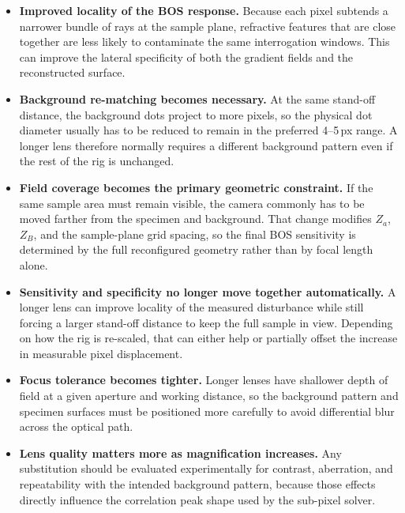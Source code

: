 \documentclass[11pt]{article}
\begin{document}
\begin{itemize}
  \item \textbf{Improved locality of the BOS response.} Because each pixel
        subtends a narrower bundle of rays at the sample plane, refractive
        features that are close together are less likely to contaminate the
        same interrogation windows. This can improve the lateral specificity
        of both the gradient fields and the reconstructed surface.

  \item \textbf{Background re-matching becomes necessary.} At the same
        stand-off distance, the background dots project to more pixels, so
        the physical dot diameter usually has to be reduced to remain in the
        preferred 4--5\,px range. A longer lens therefore normally requires
        a different background pattern even if the rest of the rig is
        unchanged.

  \item \textbf{Field coverage becomes the primary geometric constraint.}
        If the same sample area must remain visible, the camera commonly has
        to be moved farther from the specimen and background. That change
        modifies $Z_a$, $Z_B$, and the sample-plane grid spacing, so the
        final BOS sensitivity is determined by the full reconfigured
        geometry rather than by focal length alone.

  \item \textbf{Sensitivity and specificity no longer move together
        automatically.} A longer lens can improve locality of the measured
        disturbance while still forcing a larger stand-off distance to keep
        the full sample in view. Depending on how the rig is re-scaled, that
        can either help or partially offset the increase in measurable
        pixel displacement.

  \item \textbf{Focus tolerance becomes tighter.} Longer lenses have
        shallower depth of field at a given aperture and working distance,
        so the background pattern and specimen surfaces must be positioned
        more carefully to avoid differential blur across the optical path.

  \item \textbf{Lens quality matters more as magnification increases.}
        Any substitution should be evaluated experimentally for contrast,
        aberration, and repeatability with the intended background pattern,
        because those effects directly influence the correlation peak shape
        used by the sub-pixel solver.
\end{itemize}
\end{document}
